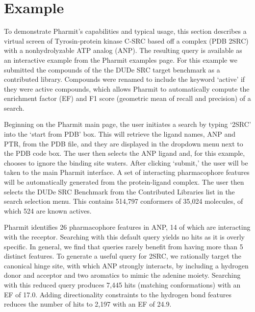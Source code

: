 \section{Example}

To demonstrate Pharmit's capabilities and typical usage, this section describes a virtual screen of Tyrosin-protein kinase C-SRC based off a complex (PDB 2SRC) with a nonhydrolyzable ATP analog (ANP). The resulting query is available as an interactive example from the Pharmit examples page.  For this example we submitted the compounds of the the DUDe \cite{Mysinger_2012} SRC target benchmark as a contributed library.  Compounds were renamed to include the keyword `active' if they were active compounds, which allows Pharmit to automatically compute the enrichment factor (EF) and F1 score (geometric mean of recall and precision) of a search.

  Beginning on the Pharmit main page, the user initiates a search by typing `2SRC' into the `start from PDB' box. This will retrieve the ligand names, ANP and PTR, from the PDB file, and they are displayed in the dropdown menu next to the PDB code box. The user then selects the ANP ligand and, for this example, chooses to ignore the binding site waters. After clicking `submit,' the user will be taken to the main Pharmit interface. A set of interacting pharmacophore features will be automatically generated from the protein-ligand complex.  The user then selects the DUDe SRC Benchmark from the Contributed Libraries list in the search selection menu.  This contains 514,797 conformers of 35,024 molecules, of which 524 are known actives.
  
  Pharmit identifies 26 pharmacophore features in ANP, 14 of which are interacting with the receptor.  Searching with this default query yields no hits as it is overly specific.  In general, we find that queries rarely benefit from having more than 5 distinct features.
  To generate a useful query for 2SRC, we rationally target the canonical hinge site, with which ANP strongly interacts, by including a hydrogen donor and acceptor and two aromatics to mimic the adenine moiety.  Searching with this reduced query produces 7,445 hits (matching conformations) with an EF of 17.0.  Adding directionality constraints to the hydrogen bond features reduces the number of hits to 2,197 with an EF of 24.9.
  

